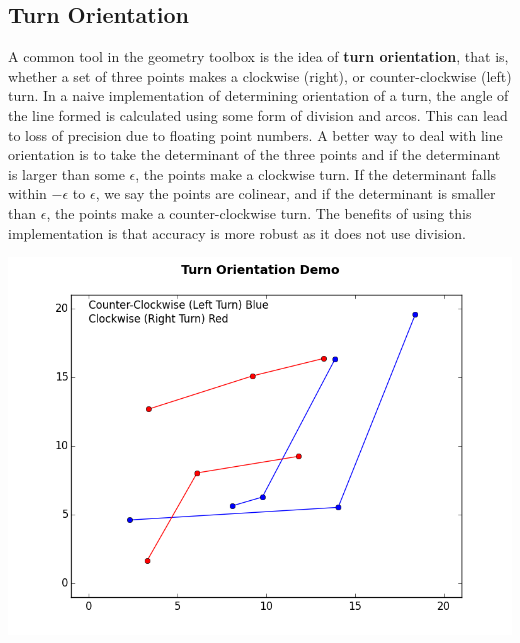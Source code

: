 \documentclass[10pt]{article}
\begin{document}
\begin{multicols}{2}
\subsection{Turn Orientation}

\indent A common tool in the geometry toolbox is the idea of \textbf{turn orientation}, that is, whether a set of three points makes a clockwise (right), or counter-clockwise (left) turn. In a naive implementation of determining orientation of a turn, the angle of the line formed is calculated using some form of division and arcos. This can lead to loss of precision due to floating point numbers. \newline
\indent A better way to deal with line orientation is to take the determinant of the three points and if the determinant is larger than some $\epsilon$, the points make a clockwise turn. If the determinant falls within $-\epsilon$ to $\epsilon$, we say the points are colinear, and if the determinant is smaller than $\epsilon$, the points make a counter-clockwise turn. The benefits of using this implementation is that accuracy is more robust as it does not use division. \newline \\
\centerline{\includegraphics[scale=.4]{turn_orientation.png}}


\end{multicols}
\end{document}
